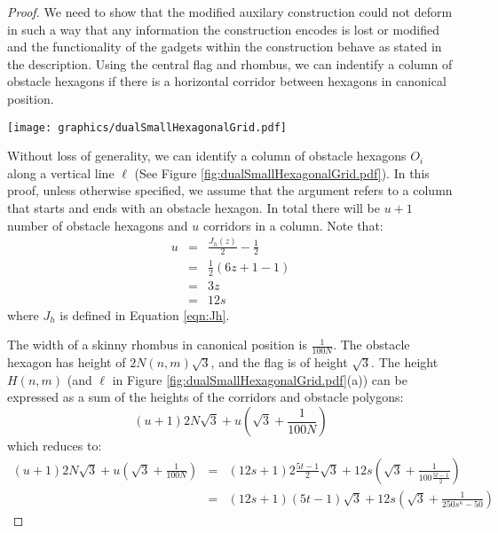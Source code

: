 \documentclass[10pt]{CSUNthesis}
\theoremstyle{plain}%
\theoremstyle{definition}
\theoremstyle{remark}
\newcommand{\lr}[1]{\left( #1 \right)}
\begin{document}
\begin{proof}
We need to show that the modified auxilary construction could not deform in such a way that any information the construction encodes is lost or modified and the functionality of the gadgets within the construction behave as stated in the description.  
Using the central flag and rhombus, we can indentify a column of obstacle hexagons if there is a horizontal corridor between hexagons in canonical position.

\begin{minipage}{\linewidth}
\begin{center}
\texttt{[image: graphics/dualSmallHexagonalGrid.pdf]}
\label{fig:dualSmallHexagonalGrid.pdf}
\end{center}
\end{minipage}

Without loss of generality, we can identify a column of obstacle hexagons $O_i$ along a vertical line $\ell$ (See Figure \ref{fig:dualSmallHexagonalGrid.pdf}).
In this proof, unless otherwise specified, we assume that the argument refers to a column that starts and ends with an obstacle hexagon.  
In total there will be $u+1$ number of obstacle hexagons and $u$ corridors in a column.
Note that:
$$\begin{array}{rcl}
u&=& \frac{J_h (z)}{2} - \frac{1}{2}\\
&=& \frac{1}{2}\lr{6z + 1 - 1}\\
&=& 3z\\
&=& 12s
\end{array}$$
where $J_h$ is defined in Equation \ref{eqn:Jh}.

The width of a skinny rhombus in canonical position is $\frac{1}{100N}$.
The obstacle hexagon has height of $ 2 N(n,m) \sqrt{3}$, and the flag is of height $\sqrt{3}$. 
The height $H(n,m)$ (and $\ell$ in Figure \ref{fig:dualSmallHexagonalGrid.pdf}(a)) can be expressed as a sum of the heights of the corridors and obstacle polygons:
$$(u+1) 2 N \sqrt{3} + u \lr{\sqrt{3}+ \frac{1}{100N}}$$
which reduces to:
\begin{eqnarray*}
(u+1) 2 N  \sqrt{3} + u \lr{\sqrt{3}+ \frac{1}{100N}}&=&(12s+1) 2 \frac{5t-1}{2}  \sqrt{3} + 12s \lr{\sqrt{3}+ \frac{1}{100\frac{5t-1}{2}}}\\
&=&(12s+1)  (5t-1)  \sqrt{3} + 12s \lr{\sqrt{3}+ \frac{1}{250s^\kappa-50}}
\end{eqnarray*}


\end{proof}
\end{document}
